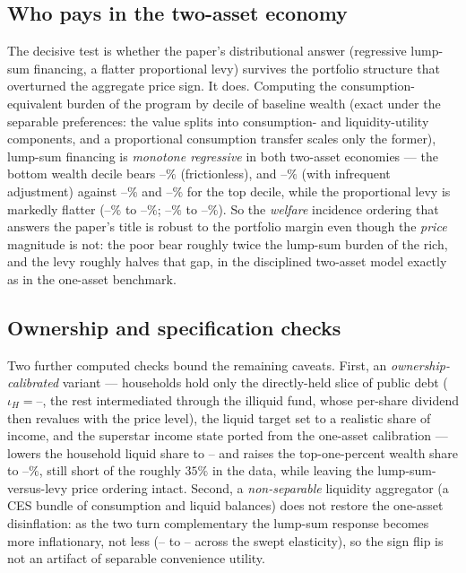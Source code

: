 \documentclass[12pt]{article}
\providecommand{\pendingnum}{\textit{--}}
\providecommand{\TwoAWelLsBot}{\pendingnum}\providecommand{\TwoAWelLsTop}{\pendingnum}
\providecommand{\TwoAWelLevyBot}{\pendingnum}\providecommand{\TwoAWelLevyTop}{\pendingnum}
\providecommand{\TwoBWelLsBot}{\pendingnum}\providecommand{\TwoBWelLsTop}{\pendingnum}
\providecommand{\TwoBWelLevyBot}{\pendingnum}\providecommand{\TwoBWelLevyTop}{\pendingnum}
\providecommand{\TwoNSlsLo}{\pendingnum}\providecommand{\TwoNSlsHi}{\pendingnum}
\providecommand{\OwnTopOne}{\pendingnum}\providecommand{\OwnOmega}{\pendingnum}\providecommand{\OwnIota}{\pendingnum}
\begin{document}
\subsection{Who pays in the two-asset economy}
\noindent The decisive test is
whether the paper's distributional answer (regressive lump-sum
financing, a flatter proportional levy) survives the portfolio
structure that overturned the aggregate price sign. It does. Computing
the consumption-equivalent burden of the program by decile of baseline
wealth (exact under the separable preferences: the value splits into
consumption- and liquidity-utility components, and a proportional
consumption transfer scales only the former), lump-sum financing is
\emph{monotone regressive} in both two-asset economies --- the bottom
wealth decile bears $\TwoAWelLsBot\%$ (frictionless), and $\TwoBWelLsBot\%$
(with infrequent adjustment) against $\TwoAWelLsTop\%$ and $\TwoBWelLsTop\%$
for the top decile, while the proportional levy is markedly flatter
($\TwoAWelLevyBot\%$ to $\TwoAWelLevyTop\%$; $\TwoBWelLevyBot\%$ to
$\TwoBWelLevyTop\%$). So the \emph{welfare} incidence ordering that
answers the paper's title is robust to the portfolio margin even though
the \emph{price} magnitude is not: the poor bear roughly twice the
lump-sum burden of the rich, and the levy roughly halves that gap, in the
disciplined two-asset model exactly as in the one-asset benchmark.


\subsection{Ownership and specification checks}
\noindent Two further computed
checks bound the remaining caveats. First, an \emph{ownership-calibrated}
variant --- households hold only the directly-held slice of public debt
($\iota_H=\OwnIota$, the rest intermediated through the illiquid fund, whose
per-share dividend then revalues with the price level), the liquid target
set to a realistic share of income, and the superstar income state ported
from the one-asset calibration --- lowers the household liquid share to
$\OwnOmega$ and raises the top-one-percent wealth share to $\OwnTopOne\%$,
still short of the roughly $35\%$ in the data, while leaving the lump-sum-versus-levy price ordering
intact. Second, a \emph{non-separable} liquidity aggregator (a CES bundle
of consumption and liquid balances) does not restore the one-asset
disinflation: as the two turn complementary the lump-sum response becomes
more inflationary, not less ($\TwoNSlsLo$ to $\TwoNSlsHi$ across the
swept elasticity), so the sign flip is not an artifact of separable
convenience utility.
\end{document}
